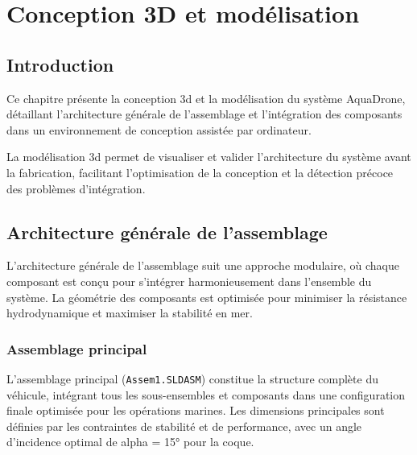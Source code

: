 \chapter[Conception 3D et modélisation]{Conception 3D et modélisation}
\label{cp:conception-3d}

{
\parindent0pt

\section{Introduction}
Ce chapitre présente la conception \gls{3d} et la modélisation du système AquaDrone, détaillant l'architecture générale de l'assemblage et l'intégration des composants dans un environnement de conception assistée par ordinateur.

\begin{block}[note]
La modélisation \gls{3d} permet de visualiser et valider l'architecture du système avant la fabrication, facilitant l'optimisation de la conception et la détection précoce des problèmes d'intégration.
\end{block}

\section{Architecture générale de l'assemblage}
L'architecture générale de l'assemblage suit une approche modulaire, où chaque composant est conçu pour s'intégrer harmonieusement dans l'ensemble du système. La géométrie des composants est optimisée pour minimiser la résistance hydrodynamique et maximiser la stabilité en mer.

\subsection{Assemblage principal}
L'assemblage principal (\texttt{Assem1.SLDASM}) constitue la structure complète du véhicule, intégrant tous les sous-ensembles et composants dans une configuration finale optimisée pour les opérations marines. Les dimensions principales sont définies par les contraintes de stabilité et de performance, avec un angle d'incidence optimal de \gls{alpha} = 15° pour la coque.

}
